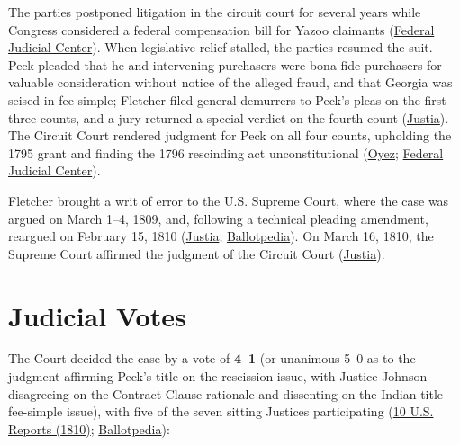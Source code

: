 \documentclass[12pt]{article}
\begin{document}
The parties postponed litigation in the circuit court for several years while Congress considered a federal compensation bill for Yazoo claimants (\href{https://www.fjc.gov/history/cases/cases-that-shaped-the-federal-courts/fletcher-v-peck}{Federal Judicial Center}). When legislative relief stalled, the parties resumed the suit. Peck pleaded that he and intervening purchasers were bona fide purchasers for valuable consideration without notice of the alleged fraud, and that Georgia was seised in fee simple; Fletcher filed general demurrers to Peck's pleas on the first three counts, and a jury returned a special verdict on the fourth count (\href{https://supreme.justia.com/cases/federal/us/10/87/}{Justia}). The Circuit Court rendered judgment for Peck on all four counts, upholding the 1795 grant and finding the 1796 rescinding act unconstitutional (\href{https://www.oyez.org/cases/1789-1850/10us87}{Oyez}; \href{https://www.fjc.gov/history/cases/cases-that-shaped-the-federal-courts/fletcher-v-peck}{Federal Judicial Center}).

Fletcher brought a writ of error to the U.S. Supreme Court, where the case was argued on March 1--4, 1809, and, following a technical pleading amendment, reargued on February 15, 1810 (\href{https://supreme.justia.com/cases/federal/us/10/87/}{Justia}; \href{https://ballotpedia.org/Fletcher_v._Peck}{Ballotpedia}). On March 16, 1810, the Supreme Court affirmed the judgment of the Circuit Court (\href{https://supreme.justia.com/cases/federal/us/10/87/}{Justia}).

\section{Judicial Votes}

The Court decided the case by a vote of \textbf{4--1} (or unanimous 5--0 as to the judgment affirming Peck's title on the rescission issue, with Justice Johnson disagreeing on the Contract Clause rationale and dissenting on the Indian-title fee-simple issue), with five of the seven sitting Justices participating (\href{https://www.supremecourt.gov/pdfs/USReports/USREPORTS-10_PDFA.pdf}{10 U.S. Reports (1810)}; \href{https://ballotpedia.org/Fletcher_v._Peck}{Ballotpedia}):
\end{document}
